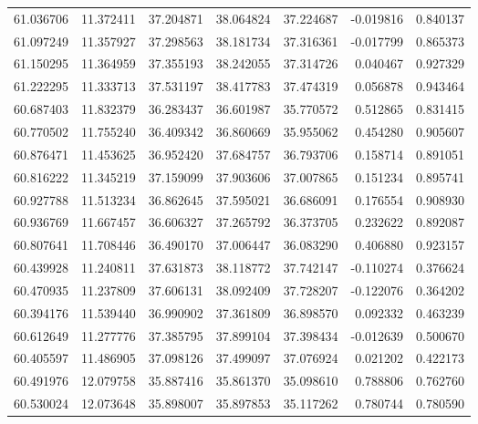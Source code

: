 \begin{tabular}{rrrrrrr}
 61.036706 &  11.372411 &         37.204871 &         38.064824 &         37.224687 & -0.019816 &  0.840137 \\
 61.097249 &  11.357927 &         37.298563 &         38.181734 &         37.316361 & -0.017799 &  0.865373 \\
 61.150295 &  11.364959 &         37.355193 &         38.242055 &         37.314726 &  0.040467 &  0.927329 \\
 61.222295 &  11.333713 &         37.531197 &         38.417783 &         37.474319 &  0.056878 &  0.943464 \\
 60.687403 &  11.832379 &         36.283437 &         36.601987 &         35.770572 &  0.512865 &  0.831415 \\
 60.770502 &  11.755240 &         36.409342 &         36.860669 &         35.955062 &  0.454280 &  0.905607 \\
 60.876471 &  11.453625 &         36.952420 &         37.684757 &         36.793706 &  0.158714 &  0.891051 \\
 60.816222 &  11.345219 &         37.159099 &         37.903606 &         37.007865 &  0.151234 &  0.895741 \\
 60.927788 &  11.513234 &         36.862645 &         37.595021 &         36.686091 &  0.176554 &  0.908930 \\
 60.936769 &  11.667457 &         36.606327 &         37.265792 &         36.373705 &  0.232622 &  0.892087 \\
 60.807641 &  11.708446 &         36.490170 &         37.006447 &         36.083290 &  0.406880 &  0.923157 \\
 60.439928 &  11.240811 &         37.631873 &         38.118772 &         37.742147 & -0.110274 &  0.376624 \\
 60.470935 &  11.237809 &         37.606131 &         38.092409 &         37.728207 & -0.122076 &  0.364202 \\
 60.394176 &  11.539440 &         36.990902 &         37.361809 &         36.898570 &  0.092332 &  0.463239 \\
 60.612649 &  11.277776 &         37.385795 &         37.899104 &         37.398434 & -0.012639 &  0.500670 \\
 60.405597 &  11.486905 &         37.098126 &         37.499097 &         37.076924 &  0.021202 &  0.422173 \\
 60.491976 &  12.079758 &         35.887416 &         35.861370 &         35.098610 &  0.788806 &  0.762760 \\
 60.530024 &  12.073648 &         35.898007 &         35.897853 &         35.117262 &  0.780744 &  0.780590 \\

\end{tabular}
